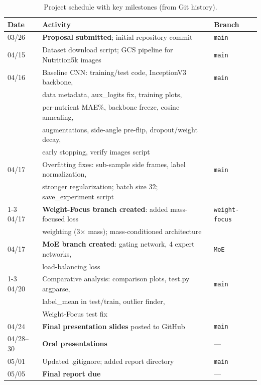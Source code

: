 \documentclass[11pt,a4paper]{article}
\begin{document}
\begin{table}[H]
\centering
\caption{Project schedule with key milestones (from Git history).}
\label{tab:schedule}
\begin{tabular}{@{}lll@{}}
\toprule
\textbf{Date} & \textbf{Activity} & \textbf{Branch} \\
\midrule
03/26 & \textbf{Proposal submitted}; initial repository commit & \texttt{main} \\
04/15 & Dataset download script; GCS pipeline for Nutrition5k images & \texttt{main} \\
04/16 & Baseline CNN: training/test code, InceptionV3 backbone, & \texttt{main} \\
       & \quad data metadata, aux\_logits fix, training plots, & \\
       & \quad per-nutrient MAE\%, backbone freeze, cosine annealing, & \\
       & \quad augmentations, side-angle pre-flip, dropout/weight decay, & \\
       & \quad early stopping, verify images script & \\
04/17 & Overfitting fixes: sub-sample side frames, label normalization, & \texttt{main} \\
       & \quad stronger regularization; batch size 32; save\_experiment script & \\
\cmidrule(lr){1-3}
04/17 & \textbf{Weight-Focus branch created}: added mass-focused loss & \texttt{weight-focus} \\
       & \quad weighting (3$\times$ mass); mass-conditioned architecture & \\
04/17 & \textbf{MoE branch created}: gating network, 4 expert networks, & \texttt{MoE} \\
       & \quad load-balancing loss & \\
\cmidrule(lr){1-3}
04/20 & Comparative analysis: comparison plots, test.py argparse, & \texttt{main} \\
       & \quad label\_mean in test/train, outlier finder, & \\
       & \quad Weight-Focus test fix & \\
04/24 & \textbf{Final presentation slides} posted to GitHub & \texttt{main} \\
04/28--30 & \textbf{Oral presentations} & --- \\
05/01 & Updated .gitignore; added report directory & \texttt{main} \\
05/05 & \textbf{Final report due} & --- \\
\bottomrule
\end{tabular}
\end{table}
\end{document}
